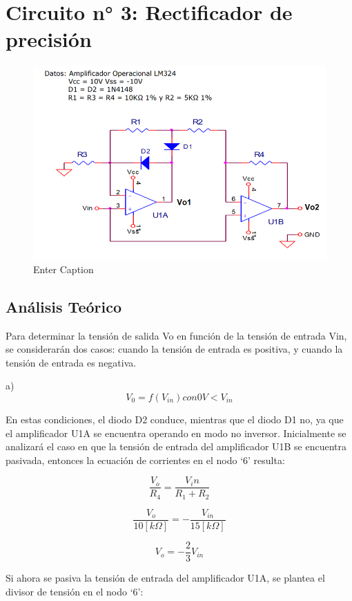 \section{Circuito n° 3: Rectificador de precisión }

\begin{figure}
    \centering
    \includegraphics[width=0.5\linewidth]{Secciones/Circuito3/circuito.png}
    \caption{Enter Caption}
    \label{fig:Circuito3}
\end{figure}

\subsection{Análisis Teórico}

Para determinar la tensión de salida Vo en función de la tensión de entrada Vin, se considerarán dos casos: cuando la tensión de entrada es positiva, y cuando la tensión de entrada es negativa.

a) \[V_0 = f(V_{in}) con 0V < V_{in}\]

En estas condiciones, el diodo D2 conduce, mientras que el diodo D1 no, ya que el amplificador U1A se encuentra operando en modo no inversor.
Inicialmente se analizará el caso en que la tensión de entrada del amplificador U1B se encuentra pasivada, entonces la ecuación de corrientes en el nodo ‘6’ resulta:

\begin{equation}
\frac{V_o}{R_4} = \frac{V_in}{R_1 + R_2}
\end{equation}

\begin{equation}
\frac{V_o}{10[k\Omega]} = -\frac{V_{in}}{15[k\Omega]}
\end{equation}

\begin{equation}
V_o = - \frac{2}{3}V_{in}
\end{equation}

Si ahora se pasiva la tensión de entrada del amplificador U1A, se plantea el divisor de tensión en el nodo ‘6’:


